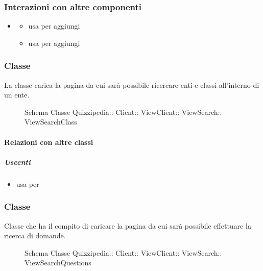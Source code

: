 \subsubsection{Interazioni con altre componenti}
\begin{itemize}
\item {}
\begin{itemize}
\item usa  per aggiungi
\item usa  per aggiungi
\end{itemize}
\end{itemize}
\subsubsection{Classe }
La classe carica la pagina da cui sarà possibile ricercare enti e classi all'interno di un ente.
\begin{figure}[H]
\centering
\noindent{}
\caption[Schema Classe ViewSearchClass]{Schema Classe Quizzipedia:: Client:: ViewClient:: ViewSearch:: ViewSearchClass}
\end{figure}
\paragraph{Relazioni con altre classi}
\subparagraph{Uscenti}
\begin{itemize}
\item usa  per 
\end{itemize}
\subsubsection{Classe }
Classe che ha il compito di caricare la pagina da cui sarà possibile effettuare la ricerca di domande.
\begin{figure}[H]
\centering
\noindent{}
\caption[Schema Classe ViewSearchQuestions]{Schema Classe Quizzipedia:: Client:: ViewClient:: ViewSearch:: ViewSearchQuestions}
\end{figure}

